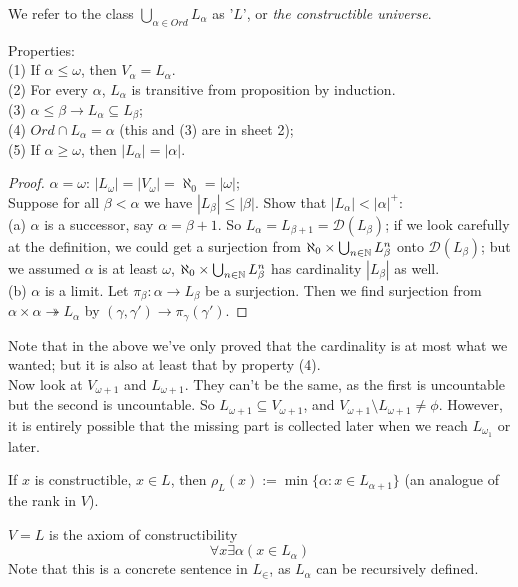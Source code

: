 \documentclass[a4paper]{article}
\begin{document}
We refer to the class $\bigcup_{\alpha \in Ord} L_\alpha$ as '$L$', or \emph{the constructible universe}.

Properties: \\
(1) If $\alpha \leq \omega$, then $V_\alpha = L_\alpha$.\\
(2) For every $\alpha$, $L_\alpha$ is transitive from proposition by induction.\\
(3) $\alpha \leq \beta \to L_\alpha \subseteq L_\beta$;\\
(4) $Ord \cap L_\alpha = \alpha$ (this and (3) are in sheet 2);\\
(5) If $\alpha \geq \omega$, then $|L_\alpha| = |\alpha|$.
\begin{proof}
$\alpha=\omega$: $|L_\omega| = |V_\omega| = \aleph_0 = |\omega|$;\\
Suppose for all $\beta < \alpha$ we have $|L_\beta| \leq |\beta|$. Show that $|L_\alpha| < |\alpha|^+$:\\
(a) $\alpha$ is a successor, say $\alpha = \beta+1$. So $L_\alpha = L_{\beta+1} = \mathcal{D}(L_\beta)$; if we look carefully at the definition, we could get a surjection from $\aleph_0 \times \bigcup_{n \in \mathbb{N}} L_\beta^n$ onto $\mathcal{D}(L_\beta)$; but we assumed $\alpha$ is at least $\omega$, $\aleph_0 \times \bigcup_{n \in \mathbb{N}} L_\beta^n$ has cardinality $|L_\beta|$ as well.\\
(b) $\alpha$ is a limit. Let $\pi_\beta: \alpha \to L_\beta$ be a surjection. Then we find surjection from $\alpha \times \alpha \twoheadrightarrow L_\alpha$ by $(\gamma,\gamma') \to \pi_\gamma(\gamma')$.
\end{proof}
Note that in the above we've only proved that the cardinality is at most what we wanted; but it is also at least that by property (4).\\

Now look at $V_{\omega+1}$ and $L_{\omega+1}$. They can't be the same, as the first is uncountable but the second is uncountable. So $L_{\omega+1} \subseteq V_{\omega+1}$, and $V_{\omega+1} \setminus L_{\omega+1} \neq \phi$. However, it is entirely possible that the missing part is collected later when we reach $L_{\omega_1}$ or later.

\begin{defi}
If $x$ is constructible, $x \in L$, then $\rho_L(x) := \min\{\alpha: x \in L_{\alpha+1}\}$ (an analogue of the rank in $V$).
\end{defi}

\begin{defi}
$V=L$ is the axiom of constructibility
\[
\forall x \exists \alpha (x \in L_\alpha)
\]
Note that this is a concrete sentence in $L_\in$, as $L_\alpha$ can be recursively defined.
\end{defi}
\end{document}
